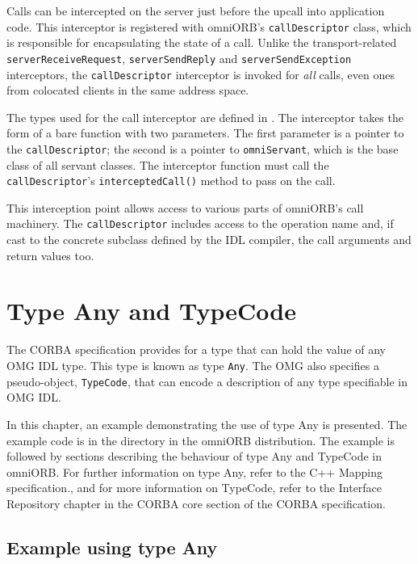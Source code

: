 \documentclass[11pt,oneside,a4paper]{book}
\newcommand{\type}[1]{\texttt{#1}}
\newcommand{\code}[1]{\texttt{#1}}
\newcommand{\op}[1]{\texttt{#1()}}
\begin{document}
Calls can be intercepted on the server just before the upcall into
application code. This interceptor is registered with omniORB's
\type{callDescriptor} class, which is responsible for encapsulating
the state of a call. Unlike the transport-related
\code{serverReceiveRequest}, \code{serverSendReply} and
\code{serverSendException} interceptors, the \type{callDescriptor}
interceptor is invoked for \emph{all} calls, even ones from colocated
clients in the same address space.

The types used for the call interceptor are defined in
. The interceptor takes the
form of a bare function with two parameters. The first parameter is a
pointer to the \type{callDescriptor}; the second is a pointer to
\type{omniServant}, which is the base class of all servant
classes. The interceptor function must call the
\type{callDescriptor}'s \op{interceptedCall} method to pass on the
call.

This interception point allows access to various parts of omniORB's
call machinery. The \type{callDescriptor} includes access to the
operation name and, if cast to the concrete subclass defined by the
IDL compiler, the call arguments and return values too.


\chapter{Type Any and TypeCode}
\label{chap:any}

The CORBA specification provides for a type that can hold the value of
any OMG IDL type. This type is known as type \type{Any}. The OMG also
specifies a pseudo-object, \type{TypeCode}, that can encode a
description of any type specifiable in OMG IDL.

In this chapter, an example demonstrating the use of type Any is
presented. The example code is in the 
directory in the omniORB distribution. The example is followed by
sections describing the behaviour of type Any and TypeCode in omniORB.
For further information on type Any, refer to the C++ Mapping
specification., and for more information on TypeCode, refer to the
Interface Repository chapter in the CORBA core section of the CORBA
specification.



\section{Example using type Any}
\end{document}
